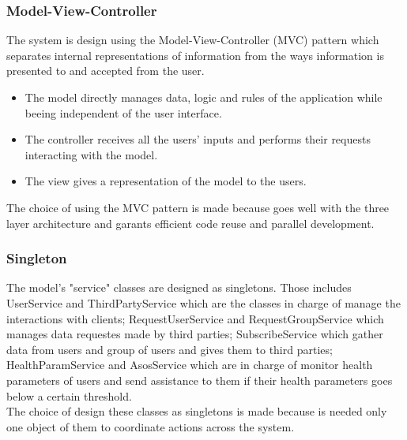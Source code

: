 \subsubsection{Model-View-Controller}
The system is design using the Model-View-Controller (MVC) pattern which separates internal representations of information from the ways information is presented to and accepted from the user. 
\begin{itemize}
	\item The model directly manages data, logic and rules of the application while beeing independent of the user interface.
	\item The controller receives all the users' inputs and performs their requests interacting with the model.
	\item The view gives a representation of the model to the users.
\end{itemize}
The choice of using the MVC pattern is made because goes well with the three layer architecture and garants efficient code reuse and parallel development.

\subsubsection{Singleton}
The model's "service" classes are designed as singletons. Those includes UserService and ThirdPartyService which are the classes in charge of manage the interactions with clients; RequestUserService and RequestGroupService which manages data requestes made by third parties; SubscribeService which gather data from users and group of users and gives them to third parties; HealthParamService and AsosService which are in charge of monitor health parameters of users and send assistance to them if their health parameters goes below a certain threshold. \\
The choice of design these classes as singletons is made because is needed only one object of them to coordinate actions across the system.
